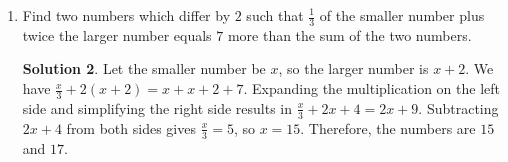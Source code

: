 \documentclass{article}
\theoremstyle{definition}
\newtheorem*{solution}{Solution}
\begin{document}
\begin{enumerate}
\begin{solution}
            If you got all the questions right, you would get the highest score
            which is $20 \cdot 5 = 100$. The second highest score possible for a
            single question is $1$, which is $4$ less than the highest possible
            score for a single question. Therefore, if you didn't get all the
            questions right, you lost at least $4$ points, so a score of $97$ is
            not possible.
        \end{solution}
        \item Find two numbers which differ by $2$ such that $\frac{1}{3}$ of
        the smaller number plus twice the larger number equals $7$ more than the
        sum of the two numbers.
        \begin{solution}
            Let the smaller number be $x$, so the larger number is $x + 2$. We
            have $\frac{x}{3} + 2(x + 2) = x + x + 2 + 7$. Expanding the
            multiplication on the left side and simplifying the right side
            results in $\frac{x}{3} + 2x + 4 = 2x + 9$. Subtracting $2x + 4$
            from both sides gives $\frac{x}{3} = 5$, so $x = 15$. Therefore, the
            numbers are $15$ and $17$.
        \end{solution}
    \end{enumerate}
\end{document}
